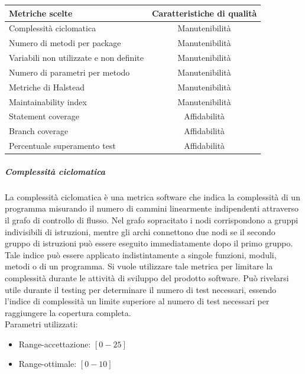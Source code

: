 \begin{center}

  \begin{tabular}{|l|c|}
    \hline
    \textbf{Metriche scelte} & \textbf{Caratteristiche di qualità} \\
    \hline
    Complessità ciclomatica  & Manutenibilità \\
    Numero di metodi per package & Manutenibilità \\
    Variabili non utilizzate e non definite & Manutenibilità \\
    Numero di parametri per metodo & Manutenibilità \\
    Metriche di Halstead  & Manutenibilità \\
    Maintainability index  & Manutenibilità \\
    Statement coverage & Affidabilità \\
    Branch coverage & Affidabilità \\
    Percentuale superamento test & Affidabilità \\
    \hline
  \end{tabular}
\end{center}


\subparagraph{Complessità ciclomatica}
La complessità ciclomatica è una metrica software che indica la complessità di un programma
misurando il numero di cammini linearmente indipendenti attraverso il grafo di controllo di flusso.
Nel grafo sopracitato i nodi corrispondono a gruppi indivisibili di istruzioni, mentre gli archi
connettono due nodi se il secondo gruppo di istruzioni può essere eseguito immediatamente dopo
il primo gruppo. Tale indice può essere applicato indistintamente a singole funzioni, moduli,
metodi o  di un programma. Si vuole utilizzare tale metrica per limitare la complessità
durante le attività di sviluppo del prodotto software. Può rivelarsi utile durante il testing per
determinare il numero  di test necessari, essendo l'indice di complessità un limite superiore
al numero di test necessari per raggiungere la copertura completa. \\

Parametri utilizzati:
\begin{itemize}
\item Range-accettazione: $[0 - 25]$
\item Range-ottimale: $[0 - 10]$
\end{itemize}

